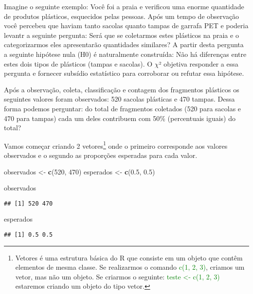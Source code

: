 \documentclass[14pt,titlepage, oneside, openany, a4paper]{book}
\newenvironment{Shaded}{\begin{snugshade}}{\end{snugshade}}
\newcommand{\DecValTok}[1]{\textcolor[rgb]{0.00,0.00,0.81}{#1}}
\newcommand{\FloatTok}[1]{\textcolor[rgb]{0.00,0.00,0.81}{#1}}
\newcommand{\KeywordTok}[1]{\textcolor[rgb]{0.13,0.29,0.53}{\textbf{#1}}}
\newcommand{\NormalTok}[1]{#1}
\newcommand{\StringTok}[1]{\textcolor[rgb]{0.31,0.60,0.02}{#1}}
\begin{document}
Imagine o seguinte exemplo: Você foi a praia e verificou uma enorme quantidade de produtos plásticos, esquecidos pelas pessoas. Após um tempo de observação você percebeu que haviam tanto sacolas quanto tampas de garrafa PET e poderia levantr a seguinte pergunta: Será que se coletarmos estes plásticos na praia e o categorizarmos eles apresentarão quantidades similares? A partir desta pergunta a seguinte hipótese nula (H0) é naturalmente construída: Não há diferenças entre estes dois tipos de plásticos (tampas e sacolas). O \(\chi\)² objetiva responder a essa pergunta e fornecer subsídio estatístico para corroborar ou refutar essa hipótese.

Após a observação, coleta, classificação e contagem dos fragmentos plásticos os seguintes valores foram observados: 520 sacolas plásticas e 470 tampas. Dessa forma podemos perguntar: do total de fragmentos coletados (520 para sacolas e 470 para tampas) cada um deles contribuem com 50\% (percentuais iguais) do total?

Vamos começar criando 2 vetores\footnote{Vetores é uma estrutura básica do R que consiste em um objeto que contêm elementos de mesma classe. Se realizarmos o comando \textcolor{green}{c(1, 2, 3)}, criamos um vetor, mas não um objeto. Se criarmos o seguinte: \textcolor{green}{teste <- c(1, 2, 3)} estaremos criando um objeto do tipo vetor.} onde o primeiro corresponde aos valores observados e o segundo as proporções esperadas para cada valor.

\begin{Shaded}
\begin{Highlighting}[]
\NormalTok{observados <-}\StringTok{ }\KeywordTok{c}\NormalTok{(}\DecValTok{520}\NormalTok{, }\DecValTok{470}\NormalTok{)}
\NormalTok{esperados <-}\StringTok{ }\KeywordTok{c}\NormalTok{(}\FloatTok{0.5}\NormalTok{, }\FloatTok{0.5}\NormalTok{)}

\NormalTok{observados}
\end{Highlighting}
\end{Shaded}

\begin{verbatim}
## [1] 520 470
\end{verbatim}

\begin{Shaded}
\begin{Highlighting}[]
\NormalTok{esperados}
\end{Highlighting}
\end{Shaded}

\begin{verbatim}
## [1] 0.5 0.5
\end{verbatim}
\end{document}
